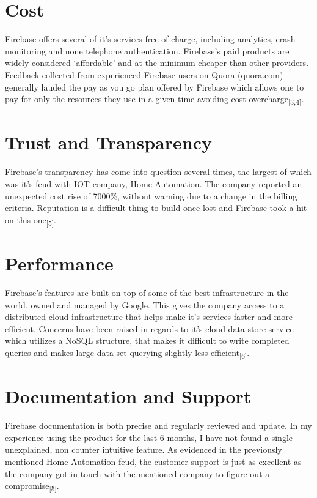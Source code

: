\documentclass{article}
\begin{document}
\section{Cost}
Firebase offers several of it’s services free of charge, including analytics, crash monitoring and none telephone authentication. Firebase’s paid products are widely considered ‘affordable’ and at the minimum cheaper than other providers. Feedback collected from experienced Firebase users on Quora (quora.com) generally lauded the pay as you go plan offered by Firebase which allows one to pay for only the resources they use in a given time avoiding cost overcharge\textsubscript{[3,4]}.

\section{Trust and Transparency}
Firebase’s transparency has come into question several times, the largest of which was it’s feud with IOT company, Home Automation. The company reported an unexpected cost rise of 7000\%, without warning due to a change in the billing criteria. Reputation is a difficult thing to build once lost and Firebase took a hit on this one\textsubscript{[5]}.

\section{Performance}
Firebase’s features are built on top of some of the best infrastructure in the world, owned and managed by Google. This gives the company access to a distributed cloud infrastructure that helps make it’s services faster and more efficient. Concerns have been raised in regards to it’s cloud data store service which utilizes a NoSQL structure, that makes it difficult to write completed queries and makes large data set querying slightly less efficient\textsubscript{[6]}.

\section{Documentation and Support}
Firebase documentation is both precise and regularly reviewed and update. In my experience using the product for the last 6 months, I have not found a single unexplained, non counter intuitive feature. As evidenced in the previously mentioned Home Automation feud, the customer support is just as excellent as the company got in touch with the mentioned company to figure out a compromise\textsubscript{[5]}.

\nocite{*}


\end{document}
